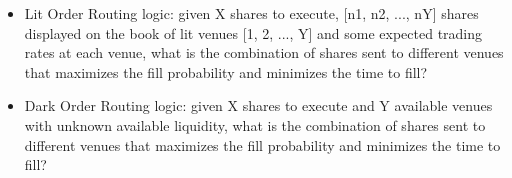 \begin{itemize}
    \begin{itemize}
        \item Lit Order Routing logic: given X shares to execute, [n1, n2, ..., nY] shares displayed on the book of lit venues [1, 2, ..., Y] and some expected trading rates at each venue, what is the combination of shares sent to different venues that maximizes the fill probability and minimizes the time to fill?
        \item Dark Order Routing logic: given X shares to execute and Y available venues with unknown available liquidity, what is the combination of shares sent to different venues that maximizes the fill probability and minimizes the time to fill?
    \end{itemize}

\end{itemize}





